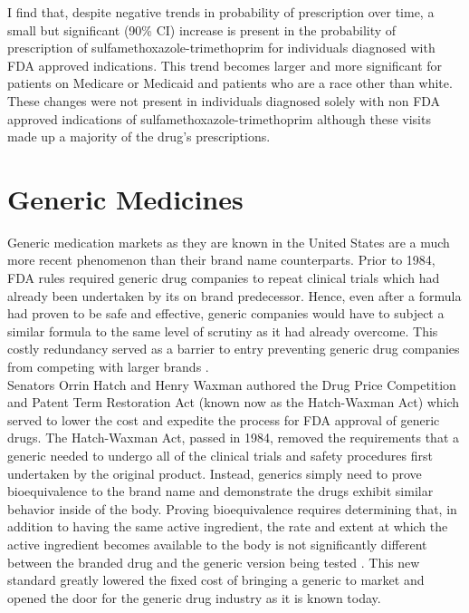\indent I find that, despite negative trends in probability of prescription over time, a small but significant (90\% CI) increase is present in the probability of prescription of sulfamethoxazole-trimethoprim for individuals diagnosed with FDA approved indications. This trend becomes larger and more significant for patients on Medicare or Medicaid and patients who are a race other than white. These changes were not present in individuals diagnosed solely with non FDA approved indications of sulfamethoxazole-trimethoprim although these visits made up a majority of the drug's prescriptions.\\

\section{Generic Medicines}
Generic medication markets as they are known in the United States are a much more recent phenomenon than their brand name counterparts. Prior to 1984, FDA rules required generic drug companies to repeat clinical trials which had already been undertaken by its on brand predecessor. Hence, even after a formula had proven to be safe and effective, generic companies would have to subject a similar formula to the same level of scrutiny as it had already overcome. This costly redundancy served as a barrier to entry preventing generic drug companies from competing with larger brands \cite{eban_bottle_2019}.\\
\indent Senators Orrin Hatch and Henry Waxman authored the Drug Price Competition and Patent Term Restoration Act (known now as the Hatch-Waxman Act) which served to lower the cost and expedite the process for FDA approval of generic drugs. The Hatch-Waxman Act, passed in 1984, removed the requirements that a generic needed to undergo all of the clinical trials and safety procedures first undertaken by the original product. Instead, generics simply need to prove bioequivalence to the brand name and demonstrate the drugs exhibit similar behavior inside of the body. Proving bioequivalence requires determining that, in addition to having the same active ingredient, the rate and extent at which the active ingredient becomes available to the body is not significantly different between the branded drug and the generic version being tested \cite{fda_primer}. This new standard greatly lowered the fixed cost of bringing a generic to market and opened the door for the generic drug industry as it is known today.\\
